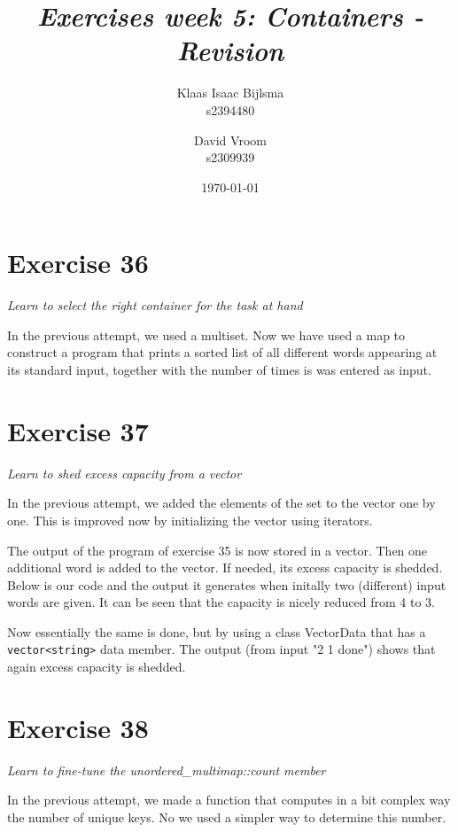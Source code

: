 \documentclass[12pt]{article}
\title{\itshape Exercises week 5: Containers - Revision}
\author{
	Klaas Isaac Bijlsma \\ s2394480
	\and
	David Vroom \\ s2309939
}
\date{\today}
\newcommand{\desc}[1]{\textit{#1} \vspace{1em}}
\begin{document}
\maketitle

\section*{Exercise 36}
\desc{Learn to select the right container for the task at hand}

In the previous attempt, we used a multiset. Now we have used a map to construct a program that prints a sorted list of all different words appearing at its standard input, together with the number of times is was entered as input.



\clearpage

\section*{Exercise 37}
\desc{Learn to shed excess capacity from a vector}

In the previous attempt, we added the elements of the set to the vector one by one. This is improved now by initializing the vector using iterators. 

The output of the program of exercise 35 is now stored in a vector. Then one additional word is added to the vector. If needed, its excess capacity is shedded. Below is our code and the output it generates when initally two (different) input words are given. It can be seen that the capacity is nicely reduced from 4 to 3. 




Now essentially the same is done, but by using a class VectorData that has a \texttt{vector<string>} data member. The output (from input "2 1 done") shows that again excess capacity is shedded. 







\clearpage

\section*{Exercise 38}
\desc{Learn to fine-tune the unordered\_multimap::count member}

In the previous attempt, we made a function that computes in a bit complex way the number of unique keys. No we used a simpler way to determine this number. 





\clearpage
\end{document}
